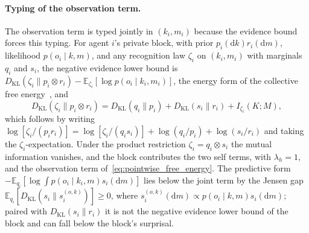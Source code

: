 \documentclass[11pt]{article}
\begin{document}
\paragraph{Typing of the observation term.} The observation term is typed jointly in $(k_i, m_i)$ because the evidence bound forces this typing. For agent $i$'s private block, with prior $p_i(\mathrm{d}k) r_i(\mathrm{d}m)$, likelihood $p(o_i \mid k, m)$, and any recognition law $\zeta_i$ on $(k_i, m_i)$ with marginals $q_i$ and $s_i$, the negative evidence lower bound is $D_{\mathrm{KL}}(\zeta_i \| p_i \otimes r_i) - \mathbb{E}_{\zeta_i}[\log p(o_i \mid k_i, m_i)]$, the energy form of the collective free energy~\cite[Ch.~5]{DennisGaugeVFE2026}, and
\begin{equation}
D_{\mathrm{KL}}(\zeta_i \| p_i \otimes r_i) = D_{\mathrm{KL}}(q_i \| p_i) + D_{\mathrm{KL}}(s_i \| r_i) + I_{\zeta_i}(K; M),
\label{eq:observation_typing_ledger}
\end{equation}
which follows by writing $\log[\zeta_i/(p_i r_i)] = \log[\zeta_i/(q_i s_i)] + \log(q_i/p_i) + \log(s_i/r_i)$ and taking the $\zeta_i$-expectation. Under the product restriction $\zeta_i = q_i \otimes s_i$ the mutual information vanishes, and the block contributes the two self terms, with $\lambda_h = 1$, and the observation term of~\eqref{eq:pointwise_free_energy}. The predictive form $-\mathbb{E}_{q_i}[\log \int p(o_i \mid k_i, m) s_i(\mathrm{d}m)]$ lies below the joint term by the Jensen gap $\mathbb{E}_{q_i}[D_{\mathrm{KL}}(s_i \| s_i^{(o,k)})] \geq 0$, where $s_i^{(o,k)}(\mathrm{d}m) \propto p(o_i \mid k, m) s_i(\mathrm{d}m)$; paired with $D_{\mathrm{KL}}(s_i \| r_i)$ it is not the negative evidence lower bound of the block and can fall below the block's surprisal.
\end{document}
